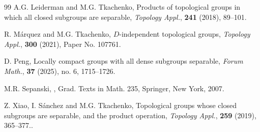 \documentclass[12pt]{amsart}
\theoremstyle{definition}
\theoremstyle{remark}
\begin{document}
\begin{thebibliography}{99}
A.G. Leiderman and M.G. Tkachenko,
\newblock Products of topological groups in which all closed subgroups are separable,
\newblock \emph{Topology Appl.}, \textbf{241} (2018), 89--101.

R. Márquez and M.G. Tkachenko, 
\newblock $D$-independent topological groups, 
\newblock \emph{Topology Appl.}, \textbf{300} (2021), Paper No. 107761.

D. Peng,
\newblock Locally compact groups with all dense subgroups separable,
\newblock \emph{Forum Math.}, \textbf{37} (2025), no. 6, 1715--1726.

M.R. Sepanski,
,
\newblock Grad. Texts in Math. 235, Springer, New York, 2007.

Z. Xiao, I. Sánchez and M.G. Tkachenko, 
\newblock Topological groups whose closed subgroups are separable, and the product operation, 
\newblock \emph{Topology Appl.}, \textbf{259} (2019), 365--377..

\end{thebibliography}
\end{document}

